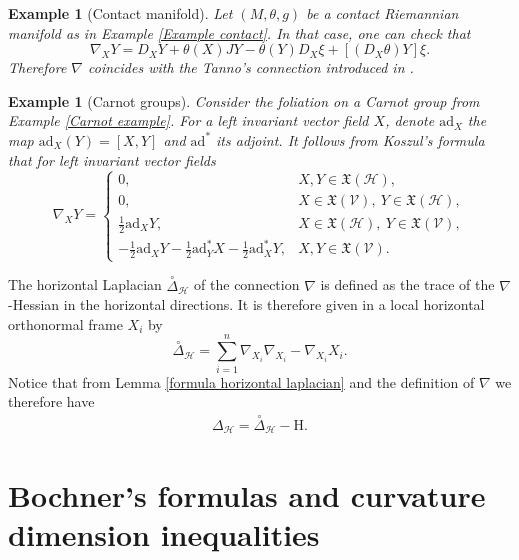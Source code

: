 \documentclass[11pt]{article}
\numberwithin{equation}{section}
\newtheorem{example}[theorem]{Example}
\newcommand{\Ho}{\mathcal H}
\begin{document}
\begin{example}[Contact manifold]
Let $(M,\theta,g)$ be a contact Riemannian manifold as in Example \ref{Example contact}. In that case, one can check that
\[
\nabla_XY=D_XY+\theta(X)JY-\theta(Y)D_X \xi +[(D_X\theta)Y]\xi .
\] 
Therefore $\nabla$ coincides with the Tanno's connection introduced in \cite{Tanno}.
\end{example}

\begin{example}[Carnot groups]
Consider the foliation on a Carnot group from Example \ref{Carnot example}. For a left invariant vector field $X$, denote $\mathrm{ad}_X$ the map $\mathrm{ad}_X (Y)=[X,Y]$ and $\mathrm{ad}^*$ its adjoint. It follows from Koszul's formula that for left invariant vector fields
\[
\nabla_X Y =
\begin{cases}
0, &X,Y \in \mathfrak{X}(\mathcal{H}), \\
  0,  &X \in \mathfrak{X}(\mathcal{V}),\ Y \in \mathfrak{X}(\mathcal{H}), \\
 \frac{1}{2} \mathrm{ad}_X Y ,  &X \in \mathfrak{X}(\mathcal{H}),\ Y \in \mathfrak{X}(\mathcal{V}), \\
 -\frac{1}{2} \mathrm{ad}_X Y-\frac{1}{2} \mathrm{ad}^*_Y X-\frac{1}{2} \mathrm{ad}^*_X Y, &X,Y \in \mathfrak{X}(\mathcal{V}).
\end{cases}
\]

\end{example}

The horizontal Laplacian $ \overset{\circ}\Delta_\Ho$ of the connection $\nabla$ is defined as the trace of the $\nabla$-Hessian in the horizontal directions. It is therefore  given in a local horizontal orthonormal frame $X_i$ by
        \[
        \overset{\circ}\Delta_\Ho=\sum_{i=1}^n \nabla_{X_i}\nabla_{X_i} - \nabla_{X_i}X_i.
        \]
Notice that from Lemma \ref{formula horizontal laplacian} and the definition of $\nabla$ we therefore have
\begin{align}\label{split horizontal laplacian}
\Delta_\Ho=\overset{\circ}\Delta_\Ho-\mathrm{H}.
\end{align}
	

	
	
	\section{Bochner's formulas and curvature dimension inequalities}
\end{document}
